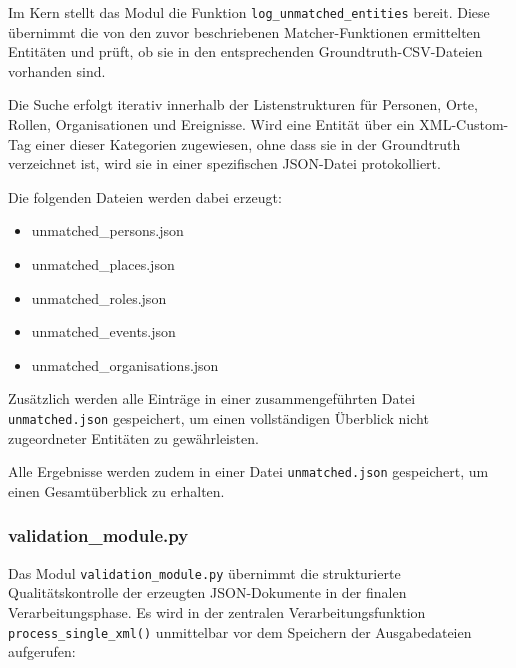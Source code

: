 \documentclass[12pt, a4paper, ngerman, bidi=default]{article}
\newcommand{\code}[1]{\colorbox{VeryLightGray}{\texttt{#1}}} %
\begin{document}
\begin{minipage}[t]{0.4\textwidth}
{} %
  \label{fig:unmatched_logger.py}
\end{minipage}


Im Kern stellt das Modul die Funktion \texttt{log\_unmatched\_entities} bereit. 
Diese übernimmt die von den zuvor beschriebenen Matcher-Funktionen ermittelten Entitäten 
und prüft, ob sie in den entsprechenden Groundtruth-CSV-Dateien vorhanden sind. 

Die Suche erfolgt iterativ innerhalb der Listenstrukturen für Personen, Orte, Rollen, Organisationen und Ereignisse. 
Wird eine Entität über ein XML-Custom-Tag einer dieser Kategorien zugewiesen, ohne dass sie in der Groundtruth verzeichnet ist, 
wird sie in einer spezifischen JSON-Datei protokolliert.

Die folgenden Dateien werden dabei erzeugt:
\begin{itemize}
  \item unmatched\_persons.json
  \item unmatched\_places.json
  \item unmatched\_roles.json
  \item unmatched\_events.json
  \item unmatched\_organisations.json
\end{itemize}

Zusätzlich werden alle Einträge in einer zusammengeführten Datei \texttt{unmatched.json} gespeichert, 
um einen vollständigen Überblick nicht zugeordneter Entitäten zu gewährleisten.


Alle Ergebnisse werden zudem in einer Datei \code{unmatched.json} gespeichert, um einen Gesamtüberblick zu erhalten.

\subsubsection{validation\_module.py}\label{subsec:validation_module}

Das Modul \code{validation\_module.py} übernimmt die strukturierte Qualitätskontrolle der erzeugten JSON-Dokumente in der finalen Verarbeitungsphase. Es wird in der zentralen Verarbeitungsfunktion \code{process\_single\_xml()} unmittelbar vor dem Speichern der Ausgabedateien aufgerufen:
\end{document}
